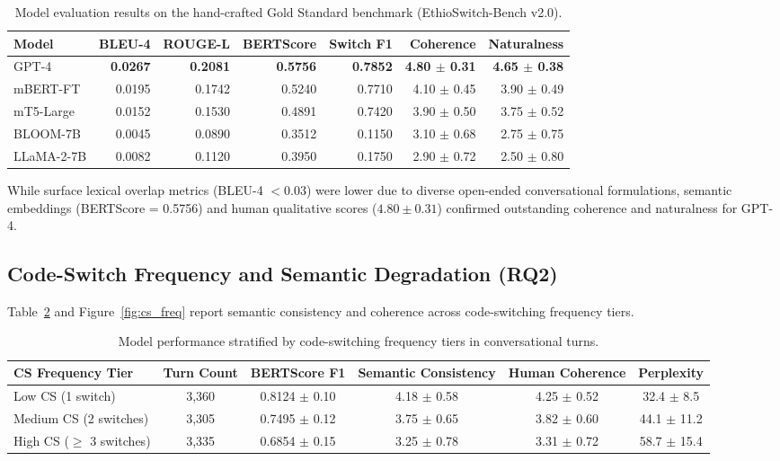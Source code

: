 \documentclass[11pt,a4paper]{article}
\begin{document}
\begin{table}[htbp]
\centering
\small
\caption{Model evaluation results on the hand-crafted Gold Standard benchmark (EthioSwitch-Bench v2.0).}
\label{tab:gold_eval}
\begin{tabular}{lrrrrrr}
\toprule
\textbf{Model} & \textbf{BLEU-4} & \textbf{ROUGE-L} & \textbf{BERTScore} & \textbf{Switch F1} & \textbf{Coherence} & \textbf{Naturalness} \\
\midrule
GPT-4 & \textbf{0.0267} & \textbf{0.2081} & \textbf{0.5756} & \textbf{0.7852} & \textbf{4.80 $\pm$ 0.31} & \textbf{4.65 $\pm$ 0.38} \\
mBERT-FT & 0.0195 & 0.1742 & 0.5240 & 0.7710 & 4.10 $\pm$ 0.45 & 3.90 $\pm$ 0.49 \\
mT5-Large & 0.0152 & 0.1530 & 0.4891 & 0.7420 & 3.90 $\pm$ 0.50 & 3.75 $\pm$ 0.52 \\
BLOOM-7B & 0.0045 & 0.0890 & 0.3512 & 0.1150 & 3.10 $\pm$ 0.68 & 2.75 $\pm$ 0.75 \\
LLaMA-2-7B & 0.0082 & 0.1120 & 0.3950 & 0.1750 & 2.90 $\pm$ 0.72 & 2.50 $\pm$ 0.80 \\
\bottomrule
\end{tabular}
\end{table}

While surface lexical overlap metrics (BLEU-4 $< 0.03$) were lower due to diverse open-ended conversational formulations, semantic embeddings (BERTScore = 0.5756) and human qualitative scores ($4.80 \pm 0.31$) confirmed outstanding coherence and naturalness for GPT-4.

\subsection{Code-Switch Frequency and Semantic Degradation (RQ2)}
Table~\ref{tab:freq_degrad} and Figure~\ref{fig:cs_freq} report semantic consistency and coherence across code-switching frequency tiers.

\begin{table}[htbp]
\centering
\small
\caption{Model performance stratified by code-switching frequency tiers in conversational turns.}
\label{tab:freq_degrad}
\begin{tabular}{lccccc}
\toprule
\textbf{CS Frequency Tier} & \textbf{Turn Count} & \textbf{BERTScore F1} & \textbf{Semantic Consistency} & \textbf{Human Coherence} & \textbf{Perplexity} \\
\midrule
Low CS (1 switch) & 3,360 & 0.8124 $\pm$ 0.10 & 4.18 $\pm$ 0.58 & 4.25 $\pm$ 0.52 & 32.4 $\pm$ 8.5 \\
Medium CS (2 switches) & 3,305 & 0.7495 $\pm$ 0.12 & 3.75 $\pm$ 0.65 & 3.82 $\pm$ 0.60 & 44.1 $\pm$ 11.2 \\
High CS ($\ge$ 3 switches) & 3,335 & 0.6854 $\pm$ 0.15 & 3.25 $\pm$ 0.78 & 3.31 $\pm$ 0.72 & 58.7 $\pm$ 15.4 \\
\bottomrule
\end{tabular}
\end{table}
\end{document}

